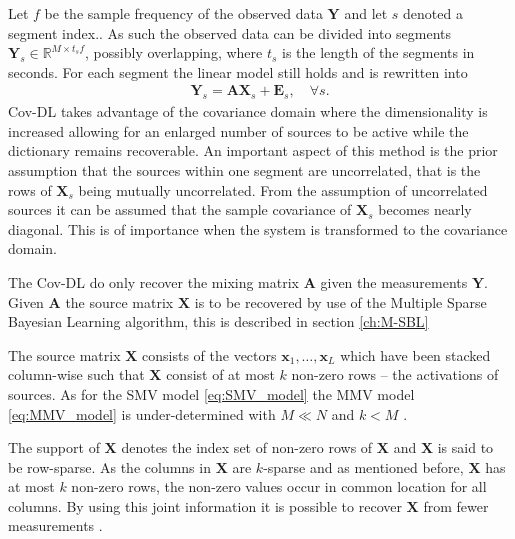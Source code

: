 Let $f$ be the sample frequency of the observed data $\mathbf{Y}$ and let $s$ denoted a segment index.. As such the observed data can be divided into segments $\mathbf{Y}_s \in \mathbb{R}^{M \times t_s f}$, possibly overlapping, where $t_s$ is the length of the segments in seconds. For each segment the linear model still holds and is rewritten into
\begin{align*}
\mathbf{Y}_s = \mathbf{AX}_s + \textbf{E}_s, \quad \forall s.
\end{align*}
Cov-DL takes advantage of the covariance domain where the dimensionality is increased allowing for an enlarged number of sources to be active while the dictionary remains recoverable.  
An important aspect of this method is the prior assumption that the sources within one segment are uncorrelated, that is the rows of $\textbf{X}_s$ being mutually uncorrelated. 
From the assumption of uncorrelated sources it can be assumed that the sample covariance of $\textbf{X}_s$ becomes nearly diagonal. This is of importance when the system is transformed to the covariance domain.    

The Cov-DL do only recover the mixing matrix $\mathbf{A}$ given the measurements $\textbf{Y}$. Given $\textbf{A}$ the source matrix $\mathbf{X}$ is to be recovered by use of the Multiple Sparse Bayesian Learning algorithm, this is described in section \ref{ch:M-SBL} 

The source matrix $\mathbf{X}$ consists of the vectors $\mathbf{x}_1, \dots, \mathbf{x}_L$ which have been stacked column-wise such that $\mathbf{X}$ consist of at most $k$ non-zero rows -- the activations of sources. As for the SMV model \eqref{eq:SMV_model} the MMV model \eqref{eq:MMV_model} is under-determined with $M \ll N$ and $k < M$ \cite[p. 42]{CS}.



The support of $\mathbf{X}$ denotes the index set of non-zero rows of $\mathbf{X}$ and $\mathbf{X}$ is said to be row-sparse. As the columns in $\mathbf{X}$ are $k$-sparse and as mentioned before, $\mathbf{X}$ has at most $k$ non-zero rows, the non-zero values occur in common location for all columns. By using this joint information it is possible to recover $\mathbf{X}$ from fewer measurements \cite[p. 43]{CS}.

